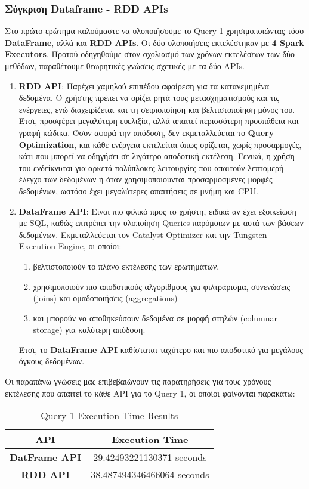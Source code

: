 \documentclass{article}
\begin{document}
\subsubsection*{Σύγκριση Dataframe - RDD APIs}
Στο πρώτο ερώτημα καλούμαστε να υλοποιήσουμε το Query 1 χρησιμοποιώντας τόσο \textbf{DataFrame}, αλλά και \textbf{RDD APIs}. Οι δύο υλοποιήσεις εκτελέστηκαν με \textbf{4 Spark Executors}. Προτού οδηγηθούμε στον σχολιασμό των χρόνων εκτελέσεων των δύο μεθόδων, παραθέτουμε θεωρητικές γνώσεις σχετικές με τα δύο APIs.
\begin{enumerate}
	\item \textbf{RDD API}: Παρέχει χαμηλού επιπέδου αφαίρεση για τα κατανεμημένα δεδομένα. Ο
			χρήστης πρέπει να ορίζει ρητά τους μετασχηματισμούς και τις ενέργειες, ενώ
			διαχειρίζεται και τη σειριοποίηση και βελτιστοποίηση μόνος του. Έτσι, προσφέρει
			μεγαλύτερη ευελιξία, αλλά απαιτεί περισσότερη προσπάθεια και γραφή κώδικα. Όσον
			αφορά την απόδοση, δεν εκμεταλλεύεται το \textbf{Query Optimization}, και κάθε ενέργεια
			εκτελείται όπως ορίζεται, χωρίς προσαρμογές, κάτι που μπορεί να οδηγήσει σε
			λιγότερο αποδοτική εκτέλεση. Γενικά, η χρήση του ενδείκνυται για αρκετά
			πολύπλοκες λειτουργίες που απαιτούν λεπτομερή έλεγχο των δεδομένων ή όταν
			χρησιμοποιούνται προσαρμοσμένες μορφές δεδομένων, ωστόσο έχει μεγαλύτερες
			απαιτήσεις σε μνήμη και CPU.
	\item \textbf{DataFrame API}: Είναι πιο φιλικό προς το χρήστη, ειδικά αν έχει εξοικείωση με SQL,
			καθώς επιτρέπει την υλοποίηση Queries παρόμοιων με αυτά των βάσεων δεδομένων.
			Εκμεταλλεύεται τον Catalyst Optimizer και την Tungsten Execution Engine, οι οποίοι:
			\begin{enumerate} 
				\item βελτιστοποιούν το πλάνο εκτέλεσης των ερωτημάτων, 
				\item χρησιμοποιούν πιο αποδοτικούς αλγορίθμους για φιλτράρισμα, συνενώσεις (joins) και 				ομαδοποιήσεις (aggregations) 
				\item και μπορούν να αποθηκεύσουν δεδομένα σε μορφή στηλών  (columnar storage) για καλύτερη απόδοση.
			\end{enumerate}
		 	Έτσι, το \textbf{DataFrame API} καθίσταται ταχύτερο και πιο αποδοτικό για μεγάλους όγκους δεδομένων.
\end{enumerate}

Οι παραπάνω γνώσεις μας επιβεβαιώνουν τις παρατηρήσεις για τους χρόνους εκτέλεσης που απαιτεί το κάθε API για το Query 1, οι οποίοι φαίνονται παρακάτω: \\
\begin{table}[H]
\centering
\caption{Query 1 Execution Time Results}
\label{tab:query1_execution_times}
\begin{tabular}{|c|c|}
\hline
\textbf{API}				& 		\textbf{Execution Time}			\\ \hline
\textbf{DatFrame API}	&		29.42493221130371 seconds		\\ \hline
\textbf{RDD API}		&		38.487494346466064 seconds		\\ \hline
\end{tabular}
\end{table}
\end{document}
